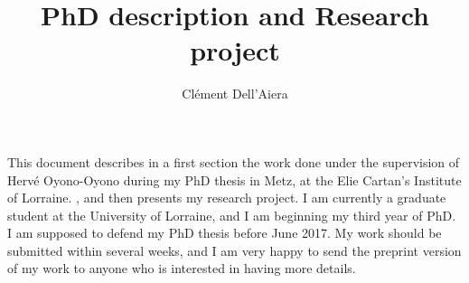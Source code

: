 \documentclass[a4paper]{article}
\title{PhD description and Research project}
\date{}
\author{ Clément Dell'Aiera}
\begin{document}
\maketitle

\newpage
This document describes in a first section 
the work done under the supervision of Hervé Oyono-Oyono during my PhD thesis in Metz, at the Elie Cartan’s Institute of Lorraine.
, and then 
presents my research project. 
I am currently a graduate student at the University of Lorraine, and I am beginning my third year of PhD. I am supposed to defend my PhD thesis before June 2017. My work should be submitted within several weeks, and I am very happy to send the preprint version of my work to anyone who is interested in having more details. \\




\newpage

 
\end{document}
